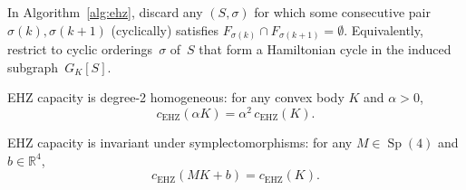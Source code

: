 \begin{corollary}\label{cor:adjacency-pruning}
In Algorithm~\ref{alg:ehz}, discard any
$(S, \sigma)$ for which some consecutive pair
$\sigma(k), \sigma(k{+}1)$ (cyclically) satisfies
$F_{\sigma(k)} \cap F_{\sigma(k+1)} = \emptyset$.
Equivalently, restrict to cyclic orderings~$\sigma$ of~$S$ that
form a Hamiltonian cycle in the induced subgraph~$G_K[S]$.
\end{corollary}


\begin{unverified}
\begin{theorem}[Conformality]\label{thm:conformality}
EHZ capacity is degree-2 homogeneous: for any convex body $K$
and $\alpha > 0$,
\[
  c_{\mathrm{EHZ}}(\alpha K) = \alpha^2\, c_{\mathrm{EHZ}}(K).
\]
\end{theorem}
\end{unverified}


\begin{unverified}
\begin{theorem}\label{thm:sympl-invariance}
EHZ capacity is invariant under symplectomorphisms: for any
$M \in \operatorname{Sp}(4)$ and $b \in \mathbb{R}^4$,
\[
  c_{\mathrm{EHZ}}(MK + b) = c_{\mathrm{EHZ}}(K).
\]
\end{theorem}
\end{unverified}



